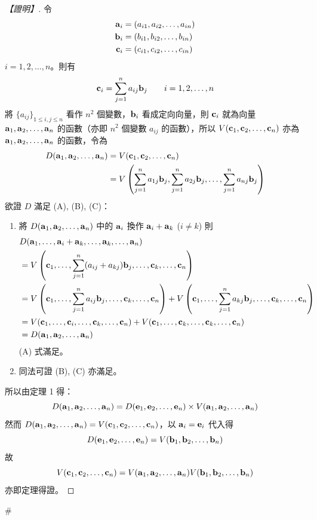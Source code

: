 \begin{proof}[【證明】]
令
\begin{align}
\vect{a}_i &= (a_{i1}, a_{i2}, \dots, a_{in}) \notag \\
\vect{b}_i &= (b_{i1}, b_{i2}, \dots, b_{in}) \label{eq:b6s-1-6-3} \\
\vect{c}_i &= (c_{i1}, c_{i2}, \dots, c_{in}) \notag
\end{align}
$i=1, 2, \dots, n$。則有
\begin{equation}
\vect{c}_i = \sum_{j=1}^n a_{ij} \vect{b}_j \qquad i=1, 2, \dots, n \label{eq:b6s-1-6-4}
\end{equation}
將 $\{ a_{ij} \}_{1 \le i, j \le n}$ 看作 $n^2$ 個變數，$\vect{b}_i$ 看成定向向量，則 $\vect{c}_i$ 就為向量 $\vect{a}_1, \vect{a}_2, \dots, \vect{a}_n$ 的函數（亦即 $n^2$ 個變數 $a_{ij}$ 的函數），所以 $V(\vect{c}_1, \vect{c}_2, \dots, \vect{c}_n)$ 亦為 $\vect{a}_1, \vect{a}_2, \dots, \vect{a}_n$ 的函數，令為
\begin{align}
D(\vect{a}_1, \vect{a}_2, \dots, \vect{a}_n) &= V(\vect{c}_1, \vect{c}_2, \dots, \vect{c}_n) \notag \\
&= V\left(\sum_{j=1}^n a_{1j}\vect{b}_j, \sum_{j=1}^n a_{2j}\vect{b}_j, \dots, \sum_{j=1}^n a_{nj}\vect{b}_j\right) \label{eq:b6s-1-6-5}
\end{align}
欲證 $D$ 滿足 (A), (B), (C)：
\begin{enumerate}[label=(\roman*), leftmargin=2em]
  \item 將 $D(\vect{a}_1, \vect{a}_2, \dots, \vect{a}_n)$ 中的 $\vect{a}_i$ 換作 $\vect{a}_i + \vect{a}_k$ ($i \ne k$) 則
  \begin{align*}
  &D(\vect{a}_1, \dots, \vect{a}_i + \vect{a}_k, \dots, \vect{a}_k, \dots, \vect{a}_n) \\
  &= V\left(\vect{c}_1, \dots, \sum_{j=1}^n (a_{ij} + a_{kj})\vect{b}_j, \dots, \vect{c}_k, \dots, \vect{c}_n\right) \\
  &= V\left(\vect{c}_1, \dots, \sum_{j=1}^n a_{ij}\vect{b}_j, \dots, \vect{c}_k, \dots, \vect{c}_n\right) + V\left(\vect{c}_1, \dots, \sum_{j=1}^n a_{kj}\vect{b}_j, \dots, \vect{c}_k, \dots, \vect{c}_n\right) \\
  &= V(\vect{c}_1, \dots, \vect{c}_i, \dots, \vect{c}_k, \dots, \vect{c}_n) + V(\vect{c}_1, \dots, \vect{c}_k, \dots, \vect{c}_k, \dots, \vect{c}_n) \\
  &= D(\vect{a}_1, \vect{a}_2, \dots, \vect{a}_n)
  \end{align*}
  (A) 式滿足。
  \item 同法可證 (B), (C) 亦滿足。
\end{enumerate}
所以由定理 1 得：
\[ D(\vect{a}_1, \vect{a}_2, \dots, \vect{a}_n) = D(\vect{e}_1, \vect{e}_2, \dots, \vect{e}_n) \times V(\vect{a}_1, \vect{a}_2, \dots, \vect{a}_n) \]
然而 $D(\vect{a}_1, \vect{a}_2, \dots, \vect{a}_n) = V(\vect{c}_1, \vect{c}_2, \dots, \vect{c}_n)$，以 $\vect{a}_i = \vect{e}_i$ 代入得
\[ D(\vect{e}_1, \vect{e}_2, \dots, \vect{e}_n) = V(\vect{b}_1, \vect{b}_2, \dots, \vect{b}_n) \]
故
\[ V(\vect{c}_1, \vect{c}_2, \dots, \vect{c}_n) = V(\vect{a}_1, \vect{a}_2, \dots, \vect{a}_n) V(\vect{b}_1, \vect{b}_2, \dots, \vect{b}_n) \]
亦即定理得證。\end{proof}\hfill$\#$

